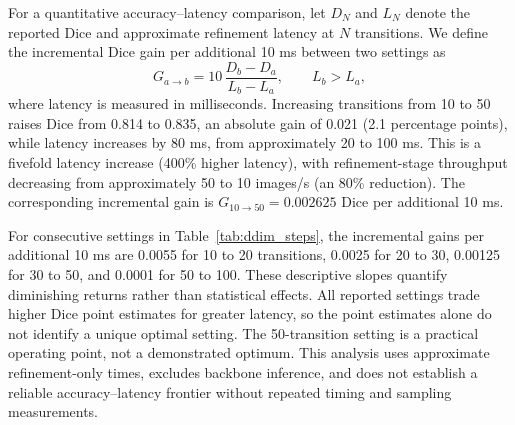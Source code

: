 \documentclass[jimaging,article,submit,pdftex,moreauthors]
  {Definitions/mdpi}
\begin{document}
\begin{table}[htbp]
\centering
\caption{Exploratory DDIM transition-count results on CHASE-DB1. Runtime includes mask encoding, feature-space refinement, and decoding but excludes LU-Net+RA coarse-mask generation. Measurements used batch size 1 on an NVIDIA GeForce RTX 4070 Ti SUPER.}
\label{tab:ddim_steps}
\small
{}
\end{table}

For a quantitative accuracy--latency comparison, let $D_N$ and $L_N$ denote the reported Dice and approximate refinement latency at $N$ transitions. We define the incremental Dice gain per additional 10 ms between two settings as
\begin{equation}
G_{a\rightarrow b}=10\,\frac{D_b-D_a}{L_b-L_a},\qquad L_b>L_a,
\end{equation}
where latency is measured in milliseconds. Increasing transitions from 10 to 50 raises Dice from 0.814 to 0.835, an absolute gain of 0.021 (2.1 percentage points), while latency increases by 80 ms, from approximately 20 to 100 ms. This is a fivefold latency increase (400\% higher latency), with refinement-stage throughput decreasing from approximately 50 to 10 images/s (an 80\% reduction). The corresponding incremental gain is $G_{10\rightarrow50}=0.002625$ Dice per additional 10 ms.

For consecutive settings in Table~\ref{tab:ddim_steps}, the incremental gains per additional 10 ms are 0.0055 for 10 to 20 transitions, 0.0025 for 20 to 30, 0.00125 for 30 to 50, and 0.0001 for 50 to 100. These descriptive slopes quantify diminishing returns rather than statistical effects. All reported settings trade higher Dice point estimates for greater latency, so the point estimates alone do not identify a unique optimal setting. The 50-transition setting is a practical operating point, not a demonstrated optimum. This analysis uses approximate refinement-only times, excludes backbone inference, and does not establish a reliable accuracy--latency frontier without repeated timing and sampling measurements.
\end{document}
